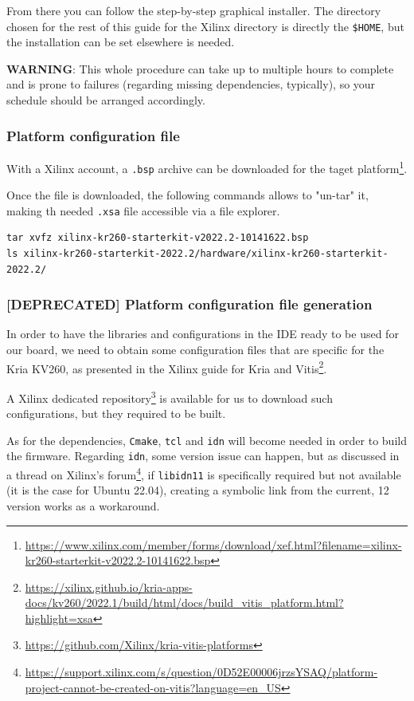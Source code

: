 \documentclass[10pt]{article}
\begin{document}
From there you can follow the step-by-step graphical installer.
The directory chosen for the rest of this guide for the Xilinx directory
is directly the \texttt{\$HOME}, but the installation can be set elsewhere is needed.

\begin{tcolorbox}[colback=orange!5!white,colframe=orange!75!black]
\textbf{WARNING}: This whole procedure can take up to multiple hours to complete
and is prone to failures (regarding missing dependencies, typically),
so your schedule should be arranged accordingly.
\end{tcolorbox}

\subsubsection{Platform configuration file}
\label{sec:org58958ed}
With a Xilinx account, a \texttt{.bsp} archive can be downloaded for the taget platform\footnote{\url{https://www.xilinx.com/member/forms/download/xef.html?filename=xilinx-kr260-starterkit-v2022.2-10141622.bsp}}.

Once the file is downloaded, the following commands allows to "un-tar" it,
making th needed \texttt{.xsa} file accessible via a file explorer.

\begin{verbatim}
tar xvfz xilinx-kr260-starterkit-v2022.2-10141622.bsp
ls xilinx-kr260-starterkit-2022.2/hardware/xilinx-kr260-starterkit-2022.2/
\end{verbatim}


\subsubsection{[DEPRECATED] Platform configuration file generation}
\label{sec:org25a8737}
In order to have the libraries and configurations in the IDE ready to be used for our board,
we need to obtain some configuration files that are specific for the Kria KV260,
as presented in the Xilinx guide for Kria and Vitis\footnote{\url{https://xilinx.github.io/kria-apps-docs/kv260/2022.1/build/html/docs/build\_vitis\_platform.html?highlight=xsa}}.

A Xilinx dedicated repository\footnote{\url{https://github.com/Xilinx/kria-vitis-platforms}} is available for us to download  such configurations,
but they required to be built.

As for the dependencies, \texttt{Cmake}, \texttt{tcl} and \texttt{idn} will become needed in order to build the firmware.
Regarding \texttt{idn}, some version issue can happen, but as discussed in a thread on Xilinx's forum\footnote{\url{https://support.xilinx.com/s/question/0D52E00006jrzsYSAQ/platform-project-cannot-be-created-on-vitis?language=en\_US}},
if \texttt{libidn11} is specifically required but not available (it is the case for Ubuntu 22.04),
creating a symbolic link from the current, 12 version works as a workaround.
\end{document}
